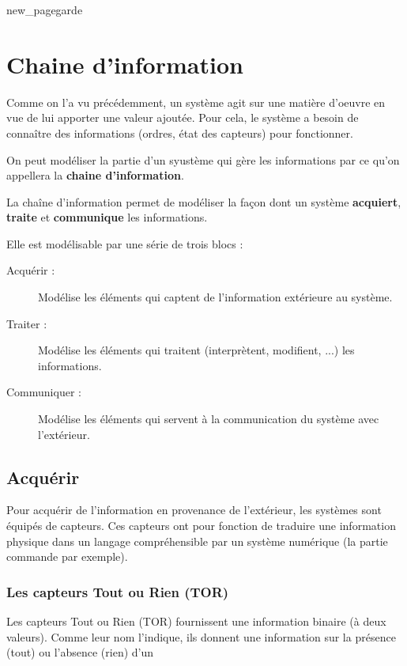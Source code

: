 \documentclass[10pt,fleqn]{article} %
\begin{document}
{new_pagegarde}

\section{Chaine d'information}

Comme on l'a vu précédemment, un système agit sur une matière d'oeuvre en vue de 
lui apporter une valeur ajoutée. Pour cela, le système a besoin de connaître des 
informations (ordres, état des capteurs) pour fonctionner. 

On peut modéliser la partie d'un syustème qui gère les informations par ce qu'on 
appellera la \textbf{chaine d'information}. 

\begin{definition}
  La chaîne d'information permet de modéliser la façon dont un système \textbf{acquiert}, \textbf{traite} et 
  \textbf{communique} les informations.  
\end{definition}

Elle est modélisable par une série de trois blocs : 
\begin{description}
  \item[Acquérir : ] Modélise les éléments qui captent de l'information 
  extérieure au système. 
  \item[Traiter : ] Modélise les éléments qui traitent (interprètent, modifient, ...) 
  les informations.
  \item[Communiquer : ] Modélise les éléments qui servent à la communication du 
  système avec l'extérieur. 
\end{description}

\subsection{Acquérir}
Pour acquérir de l'information en provenance de l'extérieur, les systèmes sont 
équipés de capteurs. Ces capteurs ont pour fonction de traduire une information  
physique dans un langage compréhensible par un système numérique (la partie commande par 
exemple).

\subsubsection{Les capteurs Tout ou Rien (TOR)}
Les capteurs Tout ou Rien (TOR) fournissent une information binaire (à deux 
valeurs). Comme leur nom l'indique, ils donnent une information sur la présence 
(tout) ou l'absence (rien) d'un 
\end{document}
